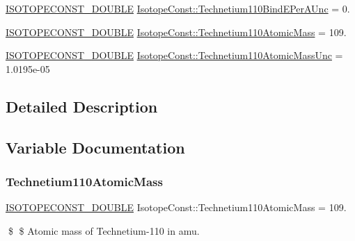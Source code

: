 \begin{DoxyCompactItemize}
\mbox{\hyperlink{group___isotope_const-_macros_ga8f45a7272ce02c0b4c65c44636ed719a}{I\+S\+O\+T\+O\+P\+E\+C\+O\+N\+S\+T\+\_\+\+D\+O\+U\+B\+LE}} \mbox{\hyperlink{group___isotope_const-_technetium-_tc110_gaf8ff8cf9533a0b07b5f7d2965b7e978f}{Isotope\+Const\+::\+Technetium110\+Bind\+E\+Per\+A\+Unc}} = 0.
\item 
\mbox{\hyperlink{group___isotope_const-_macros_ga8f45a7272ce02c0b4c65c44636ed719a}{I\+S\+O\+T\+O\+P\+E\+C\+O\+N\+S\+T\+\_\+\+D\+O\+U\+B\+LE}} \mbox{\hyperlink{group___isotope_const-_technetium-_tc110_gae2aa84af43cb5bf7e6d2ccb9d7535640}{Isotope\+Const\+::\+Technetium110\+Atomic\+Mass}} = 109.
\item 
\mbox{\hyperlink{group___isotope_const-_macros_ga8f45a7272ce02c0b4c65c44636ed719a}{I\+S\+O\+T\+O\+P\+E\+C\+O\+N\+S\+T\+\_\+\+D\+O\+U\+B\+LE}} \mbox{\hyperlink{group___isotope_const-_technetium-_tc110_ga41f7b0c87145692af813cd056351b2d0}{Isotope\+Const\+::\+Technetium110\+Atomic\+Mass\+Unc}} = 1.\+0195e-\/05
\end{DoxyCompactItemize}


\subsection{Detailed Description}


\subsection{Variable Documentation}
\mbox{\label{group___isotope_const-_technetium-_tc110_gae2aa84af43cb5bf7e6d2ccb9d7535640}} 
\subsubsection{\texorpdfstring{Technetium110\+Atomic\+Mass}{Technetium110AtomicMass}}
{\footnotesize\ttfamily \mbox{\hyperlink{group___isotope_const-_macros_ga8f45a7272ce02c0b4c65c44636ed719a}{I\+S\+O\+T\+O\+P\+E\+C\+O\+N\+S\+T\+\_\+\+D\+O\+U\+B\+LE}} Isotope\+Const\+::\+Technetium110\+Atomic\+Mass = 109.}

\$ \$ Atomic mass of Technetium-\/110 in amu. \mbox{\label{group___isotope_const-_technetium-_tc110_ga41f7b0c87145692af813cd056351b2d0}} 
